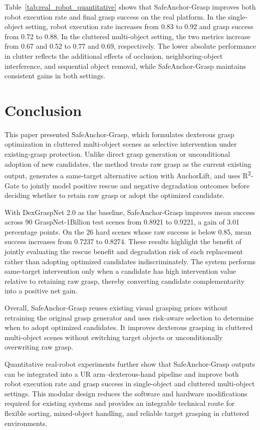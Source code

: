 \documentclass[lettersize,journal]{IEEEtran}
\begin{document}
Table~\ref{tab:real_robot_quantitative} shows that SafeAnchor-Grasp improves both robot execution rate and final grasp success on the real platform. In the single-object setting, robot execution rate increases from 0.83 to 0.92 and grasp success from 0.72 to 0.88. In the cluttered multi-object setting, the two metrics increase from 0.67 and 0.52 to 0.77 and 0.69, respectively. The lower absolute performance in clutter reflects the additional effects of occlusion, neighboring-object interference, and sequential object removal, while SafeAnchor-Grasp maintains consistent gains in both settings.

\section{Conclusion}

This paper presented SafeAnchor-Grasp, which formulates dexterous grasp optimization in cluttered multi-object scenes as selective intervention under existing-grasp protection. Unlike direct grasp generation or unconditional adoption of new candidates, the method treats raw grasp as the current existing output, generates a same-target alternative action with AnchorLift, and uses R\textsuperscript{2}-Gate to jointly model positive rescue and negative degradation outcomes before deciding whether to retain raw grasp or adopt the optimized candidate.

With DexGraspNet 2.0 as the baseline, SafeAnchor-Grasp improves mean success across 90 GraspNet-1Billion test scenes from 0.8921 to 0.9221, a gain of 3.01 percentage points. On the 26 hard scenes whose raw success is below 0.85, mean success increases from 0.7237 to 0.8274. These results highlight the benefit of jointly evaluating the rescue benefit and degradation risk of each replacement rather than adopting optimized candidates indiscriminately. The system performs same-target intervention only when a candidate has high intervention value relative to retaining raw grasp, thereby converting candidate complementarity into a positive net gain.

Overall, SafeAnchor-Grasp reuses existing visual grasping priors without retraining the original grasp generator and uses risk-aware selection to determine when to adopt optimized candidates. It improves dexterous grasping in cluttered multi-object scenes without switching target objects or unconditionally overwriting raw grasp.

Quantitative real-robot experiments further show that SafeAnchor-Grasp outputs can be integrated into a UR arm--dexterous-hand pipeline and improve both robot execution rate and grasp success in single-object and cluttered multi-object settings. This modular design reduces the software and hardware modifications required for existing systems and provides an integrable technical route for flexible sorting, mixed-object handling, and reliable target grasping in cluttered environments.
\end{document}

